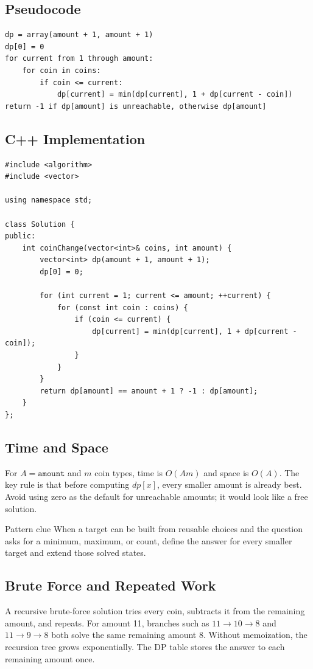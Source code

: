 \subsection{Pseudocode}
\begin{lstlisting}[style=pseudocode]
dp = array(amount + 1, amount + 1)
dp[0] = 0
for current from 1 through amount:
    for coin in coins:
        if coin <= current:
            dp[current] = min(dp[current], 1 + dp[current - coin])
return -1 if dp[amount] is unreachable, otherwise dp[amount]
\end{lstlisting}

\subsection{C++ Implementation}
\begin{lstlisting}[style=compactcode,caption={Complete C++ solution: Coin Change}]
#include <algorithm>
#include <vector>

using namespace std;

class Solution {
public:
    int coinChange(vector<int>& coins, int amount) {
        vector<int> dp(amount + 1, amount + 1);
        dp[0] = 0;

        for (int current = 1; current <= amount; ++current) {
            for (const int coin : coins) {
                if (coin <= current) {
                    dp[current] = min(dp[current], 1 + dp[current - coin]);
                }
            }
        }
        return dp[amount] == amount + 1 ? -1 : dp[amount];
    }
};
\end{lstlisting}

\subsection{Time and Space}
For \(A=\texttt{amount}\) and \(m\) coin types, time is \(O(A m)\) and space
is \(O(A)\). The key rule is that before computing \(dp[x]\), every smaller
amount is already best. Avoid using zero as the default for unreachable
amounts; it would look like a free solution.

\begin{revisionbox}{Pattern clue}
When a target can be built from reusable choices and the question asks for a
minimum, maximum, or count, define the answer for every smaller target and
extend those solved states.
\end{revisionbox}

\subsection{Brute Force and Repeated Work}
A recursive brute-force solution tries every coin, subtracts it from the
remaining amount, and repeats. For amount 11, branches such as
\(11\to10\to8\) and \(11\to9\to8\) both solve the same remaining amount 8.
Without memoization, the recursion tree grows exponentially. The DP table
stores the answer to each remaining amount once.

